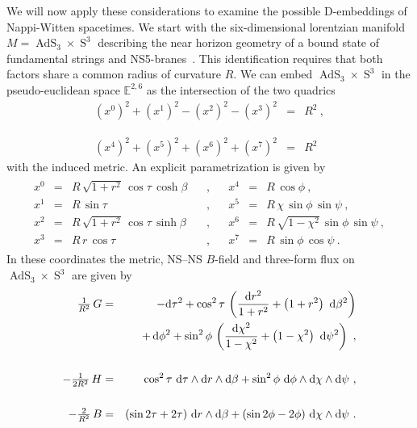 \documentclass[11pt,a4paper]{article}
\DeclareMathOperator{\AdS}{AdS}
\DeclareMathOperator{\Sphere}{S}
\def\dd{{\rm d}}
\newcommand{\eucl}{{\mathbb E}}
\def\nn{\nonumber}
\def\bea{\begin{eqnarray}}
\def\eea{\end{eqnarray}}
\newcommand{\beq}{\begin{eqnarray}}
\newcommand{\eeq}{\end{eqnarray}}
\begin{document}
We will now apply these considerations to examine the possible
D-embeddings of Nappi-Witten spacetimes. We start with the
six-dimensional lorentzian manifold $M=\AdS_3\times\Sphere^3$
describing the near horizon geometry of a bound state of fundamental
strings and NS5-branes~\cite{GKS1}. This identification requires that
both factors share a common radius of curvature $R$. We can embed
$\AdS_3\times\Sphere^3$ in the pseudo-euclidean space $\eucl^{2,6}$ as
the intersection of the two quadrics
\bea
\left(x^0\right)^2+\left(x^1\right)^2-\left(x^2\right)^2-\left(x^3\right)^2
&=&R^2\ , \label{AdS3quadric}\\&&{~~~~}^{~~}_{~~}\nn\\
\left(x^4\right)^2+\left(x^5\right)^2+\left(x^6\right)^2+\left(x^7\right)^2
&=&R^2
\label{S3quadric}\eea
with the induced metric. An explicit parametrization is given by
\beq
\begin{matrix}
x^0&=&R\,\sqrt{1+r^2}\,\cos\tau\,\cosh\beta ~~~~ &,& ~~~~
x^4&=&R\,\cos\phi \ , \\x^1&=&R\,\sin\tau
{}~~~~ &,& ~~~~ x^5&=&R\,\chi\,\sin\phi\,\sin\psi \ , \\x^2&=&R\,\sqrt{1+r^2}\,
\cos\tau\,\sinh\beta
{}~~~~ &,& ~~~~ x^6&=&R\,\sqrt{1-\chi^2}\,\sin\phi\,\sin\psi
\ , \\x^3&=&R\,r\,\cos\tau ~~~~ &,& ~~~~ x^7&=&R\,\sin\phi\,\cos\psi \ .
\end{matrix}
\label{AdS3S3param}\eeq
In these coordinates the metric, NS--NS $B$-field and
three-form flux on $\AdS_3\times\Sphere^3$ are given by
\bea
\mbox{$\frac1{R^2}$}\,
G&=&-\dd\tau^2+\cos^2\tau\,\left(\frac{\dd r^2}{1+r^2}+\left(1+r^2
\right)~\dd\beta^2\right)\nn\\&&+\,\dd\phi^2+\sin^2\phi\,\left(
\frac{\dd\chi^2}{1-\chi^2}+\left(1-\chi^2\right)~\dd\psi^2\right) \ ,
\label{AdS3S3metric}\\&&{~~~~}^{~~}_{~~}\nn\\
-\mbox{$\frac1{2R^2}$}\,H&=&\cos^2\tau~\dd\tau\wedge
\dd r\wedge\dd\beta+\sin^2\phi~\dd\phi\wedge\dd\chi\wedge\dd\psi \ ,
\label{AdS3S3flux}\\&&{~~~~}_{~~}^{~~}\nn\\-\mbox{$\frac2{R^2}$}\,
B&=&(\sin2\tau+2\tau)~\dd r\wedge\dd\beta+
(\sin2\phi-2\phi)~\dd\chi\wedge\dd\psi \ .
\label{AdS3S3Bfield}\eea
\end{document}
